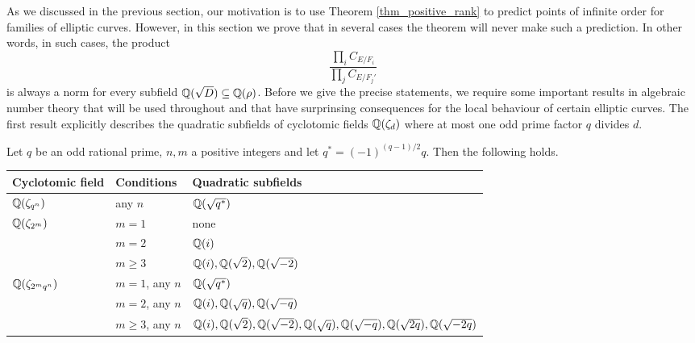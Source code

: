 As we discussed in the previous section, our motivation is to use Theorem \ref*{thm_positive_rank} to predict points of infinite order for families of elliptic curves. However, in this section we prove that in several cases the theorem will never make such a prediction. In other words, in such cases, the product
\begin{equation}\label{eqn_localprod}
    \frac{\prod_i C_{E/F_i}}{\prod_j C_{E/F_j'}}
\end{equation}
is always a norm for every subfield $\mathbb{Q}(\sqrt{D})\subseteq\mathbb{Q}(\rho)$. Before we give the precise statements, we require some important results in algebraic number theory that will be used throughout and that have surprinsing consequences for the local behaviour of certain elliptic curves. The first result explicitly describes the quadratic subfields of cyclotomic fields $\mathbb{Q}(\zeta_d)$ where at most one odd prime factor $q$ divides $d$.

\begin{lemma}\label{lem_subfields}
    Let $q$ be an odd rational prime, $n,m$ a positive integers and let $q^*=(-1)^{(q-1)/2}q$. Then the following holds.

    \begin{table}[!ht]
        \centering
        \begin{tabular}{|l|l|l|}
        \hline
        Cyclotomic field                    & Conditions & Quadratic subfields                   \\ \hline
        $\mathbb{Q}(\zeta_{q^n})$                  & any $n$    & $\mathbb{Q}(\sqrt{q^*})$            \\ \hline
        \multirow{3}{*}{$\mathbb{Q}(\zeta_{2^m})$} & $m=1$      & none                                  \\ \cline{2-3} 
                                            & $m=2$      & $\mathbb{Q}(i)$                              \\ \cline{2-3} 
                                            & $m\geq3$   & $\mathbb{Q}(i),\mathbb{Q}(\sqrt{2}),\mathbb{Q}(\sqrt{-2})$ \\ \hline
        \multirow{3}{*}{$\mathbb{Q}(\zeta_{2^mq^n})$}  & $m=1$, any $n$      & $\mathbb{Q}(\sqrt{q^*})$     \\ \cline{2-3} 
                                            & $m=2$, any $n$      & $\mathbb{Q}(i),\mathbb{Q}(\sqrt{q}),\mathbb{Q}(\sqrt{-q})$                              \\ \cline{2-3}
                                            & $m\geq 3$, any $n$      & $\mathbb{Q}(i),\mathbb{Q}(\sqrt{2}),\mathbb{Q}(\sqrt{-2}),\mathbb{Q}(\sqrt{q}),\mathbb{Q}(\sqrt{-q}),\mathbb{Q}(\sqrt{2q}),\mathbb{Q}(\sqrt{-2q})$                              \\ 
                                             \hline
        \end{tabular}
        \end{table}

\end{lemma}

